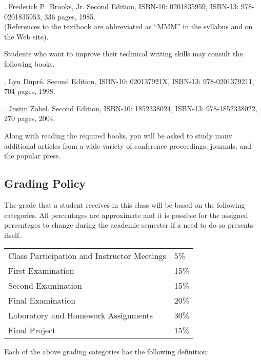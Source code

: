 . Frederick P.\ Brooks, Jr.
Second Edition, ISBN-10: 0201835959, ISBN-13: 978-0201835953, 336 pages, 1985. \\
(References to the textbook are abbreviated as ``MMM'' in the syllabus and on the Web site).

\noindent
Students who want to improve their technical writing skills may consult the following books.

. Lyn Dupr\'e. Second Edition,  ISBN-10: 020137921X,
ISBN-13: 978-0201379211, 704 pages, 1998.

.  Justin Zobel. Second Edition,  ISBN-10: 1852338024, ISBN-13:
978-1852338022, 270 pages, 2004.

Along with reading the required books, you will be asked to study many additional articles from a wide variety of
conference proceedings, journals, and the popular press.

\subsection*{Grading Policy}

The grade that a student receives in this class will be based on the
following categories. All percentages are approximate and it is possible
for the assigned percentages to change during the academic semester if a
need to do so presents itself. 

\begin{center}
\begin{tabular}{ll}
Class Participation and Instructor Meetings & 5\% \\
First Examination & 15\% \\
Second Examination & 15\% \\
Final Examination & 20\% \\
Laboratory and Homework Assignments & 30\% \\
Final Project & 15\%
\end{tabular}
\end{center}

Each of the above grading categories has the following definition:

